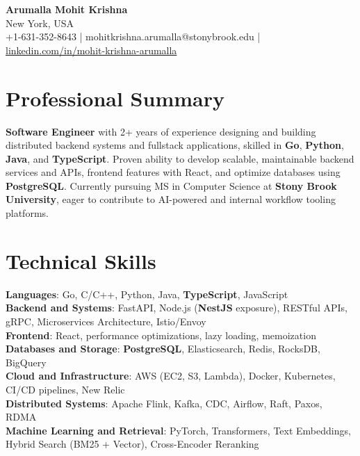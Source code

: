 \documentclass[letterpaper,11pt]{article}
\begin{document}
\begin{center}
  {\Large \textbf{Arumalla Mohit Krishna}} \\
  New York, USA \\
  +1-631-352-8643 \enspace | \enspace mohitkrishna.arumalla@stonybrook.edu \enspace | \enspace \href{https://www.linkedin.com/in/mohit-krishna-arumalla}{linkedin.com/in/mohit-krishna-arumalla}
\end{center}

\section{Professional Summary}
  \begin{itemize}[leftmargin=0.15in, label={}]
    \small{\item{
     \textbf{Software Engineer} with 2+ years of experience designing and building distributed backend systems and fullstack applications, skilled in \textbf{Go}, \textbf{Python}, \textbf{Java}, and \textbf{TypeScript}. Proven ability to develop scalable, maintainable backend services and APIs, frontend features with React, and optimize databases using \textbf{PostgreSQL}. Currently pursuing MS in Computer Science at \textbf{Stony Brook University}, eager to contribute to AI-powered and internal workflow tooling platforms.
    }}
  \end{itemize}
\vspace{-16pt}

\section{Technical Skills}
 \begin{itemize}[leftmargin=0.15in, label={}]
    \small{\item{
     \textbf{Languages}: Go, C/C++, Python, Java, \textbf{TypeScript}, JavaScript \\
     \textbf{Backend and Systems}: FastAPI, Node.js (\textbf{NestJS} exposure), RESTful APIs, gRPC, Microservices Architecture, Istio/Envoy \\
     \textbf{Frontend}: React, performance optimizations, lazy loading, memoization \\
     \textbf{Databases and Storage}: \textbf{PostgreSQL}, Elasticsearch, Redis, RocksDB, BigQuery \\
     \textbf{Cloud and Infrastructure}: AWS (EC2, S3, Lambda), Docker, Kubernetes, CI/CD pipelines, New Relic \\
     \textbf{Distributed Systems}: Apache Flink, Kafka, CDC, Airflow, Raft, Paxos, RDMA \\
     \textbf{Machine Learning and Retrieval}: PyTorch, Transformers, Text Embeddings, Hybrid Search (BM25 + Vector), Cross-Encoder Reranking
    }}
 \end{itemize}
\vspace{-16pt}
\end{document}

